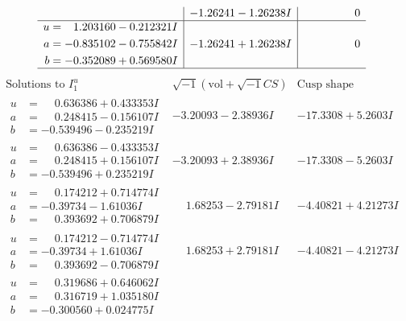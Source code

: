 \documentclass[1p]{elsarticle_modified}
\theoremstyle{definition}
\newcommand{\I}{\sqrt{-1}}
\begin{document}
$$\begin{array}{c|c|c}
 & -1.26241 - 1.26238 I & \phantom{-0.000000 } 0 \\ \hline\begin{aligned}
u &= \phantom{-}1.203160 - 0.212321 I \\
a &= -0.835102 - 0.755842 I \\
b &= -0.352089 + 0.569580 I\end{aligned}
 & -1.26241 + 1.26238 I & \phantom{-0.000000 } 0\\
 \hline 
 \end{array}$$\newpage$$\begin{array}{c|c|c}  
\text{Solutions to }I^u_{1}& \I (\text{vol} + \sqrt{-1}CS) & \text{Cusp shape}\\
 \hline 
\begin{aligned}
u &= \phantom{-}0.636386 + 0.433353 I \\
a &= \phantom{-}0.248415 - 0.156107 I \\
b &= -0.539496 - 0.235219 I\end{aligned}
 & -3.20093 - 2.38936 I & -17.3308 + 5.2603 I \\ \hline\begin{aligned}
u &= \phantom{-}0.636386 - 0.433353 I \\
a &= \phantom{-}0.248415 + 0.156107 I \\
b &= -0.539496 + 0.235219 I\end{aligned}
 & -3.20093 + 2.38936 I & -17.3308 - 5.2603 I \\ \hline\begin{aligned}
u &= \phantom{-}0.174212 + 0.714774 I \\
a &= -0.39734 - 1.61036 I \\
b &= \phantom{-}0.393692 + 0.706879 I\end{aligned}
 & \phantom{-}1.68253 - 2.79181 I & -4.40821 + 4.21273 I \\ \hline\begin{aligned}
u &= \phantom{-}0.174212 - 0.714774 I \\
a &= -0.39734 + 1.61036 I \\
b &= \phantom{-}0.393692 - 0.706879 I\end{aligned}
 & \phantom{-}1.68253 + 2.79181 I & -4.40821 - 4.21273 I \\ \hline\begin{aligned}
u &= \phantom{-}0.319686 + 0.646062 I \\
a &= \phantom{-}0.316719 + 1.035180 I \\
b &= -0.300560 + 0.024775 I\end{aligned}

\end{array}$$
\end{document}
